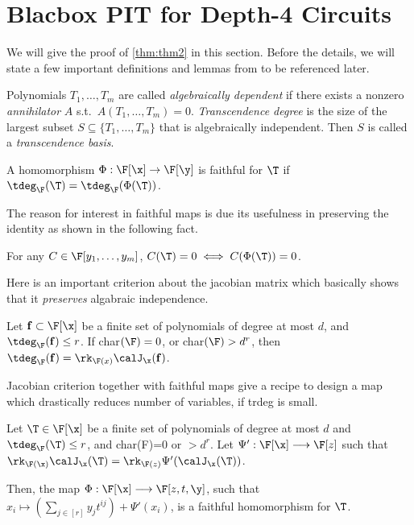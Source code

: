 \section{Blacbox PIT for Depth-4 Circuits} \label{sec:pf-thm2}

We will give the proof of \autoref{thm:thm2} in this section. Before the details, we will state a few important definitions and lemmas from \cite{agrawal2016jacobian} to be referenced later.

\begin{definition}
    Polynomials $T_1,\hdots,T_m$ are called {\em algebraically dependent} if there exists a nonzero {\em annihilator} $A$ s.t.~$A(T_1,\hdots,T_m) = 0$. {\em Transcendence degree} is the size of the largest subset $S\subseteq \{T_1,\hdots,T_m\}$ that is algebraically independent. Then $S$ is called a {\em transcendence basis}.
\end{definition}

\begin{definition}
    A homomorphism $\Phi : \F[\x] \to \F[\y]$ is faithful for $\T$ if $\tdeg_{\F}(\T) = \tdeg_{\F}(\Phi(\T))$.
\end{definition}
    
The reason for interest in faithful maps is due its usefulness in preserving the identity as shown in the following fact.

\begin{fact}\label{fact:faithful-is-useful}
    For any $C \in \F[y_1,\hdots,y_m]$, $C(\T) = 0 \iff C(\Phi(\T))=0$. 
\end{fact}

Here is an important criterion about the jacobian matrix which basically shows that it \emph{preserves} algabraic independence.
    
\begin{fact} \label{fact:jacobian-criterion}
    Let ${\bf f} \subset \F[\x]$ be a finite set of polynomials of degree at most $d$, and $\tdeg_{\F} ({\bf f}) \le r$. If char$(\F) = 0$, or char$(\F) > d^r$, then $\tdeg_{\F} ({\bf f}) =
    \rk_{\F(x)} \calJ_{\x}({\bf f})$.
\end{fact}

Jacobian criterion together with faithful maps give a recipe to design a map which drastically reduces number of variables, if trdeg is small.

\begin{lemma} \label{lem:faithful}
    Let $\T \in \F[\x]$ be a finite set of polynomials
    of degree at most $d$ and $\tdeg_{\F}(\T) \le r$, and char(F)=$0$ or $> d^r$. Let $\Psi' : \F[\x] \longrightarrow \F[z]$ such that $\rk_{\F(\x)} \calJ_{\x}(\T) = \rk_{\F(z)} \Psi'(\calJ_{\x}(\T))$. 
    
    Then, the map $\Phi : \F[\x] \longrightarrow \F[z,t,\y]$, such that $x_i \mapsto (\sum_{j\in [r]} y_j t^{ij}) + \Psi'(x_i)$, is a faithful homomorphism for $\T$.
\end{lemma}


